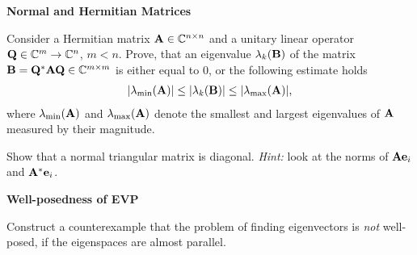 
\begin{Sheet}
  \label{sheet3}
  
  \textbf{Normal and Hermitian Matrices}
  
  \begin{Problem}
    Consider a Hermitian matrix $\mathbf A\in\mathbb C^{n\times n}$ and a unitary
    linear operator $\mathbf Q\in\mathbb C^m\to\mathbb C^n$, $m<n$. Prove, that an
    eigenvalue $\lambda_k(\mathbf B)$ of the matrix
    $\mathbf B=\mathbf Q^*\mathbf A\mathbf Q\in\mathbb C^{m\times m}$ is either equal to 0,
    or the following estimate holds
    \begin{gather*}
      \lvert\lambda_{\min}(\mathbf A)\rvert
      \leq \lvert\lambda_{k}(\mathbf B)\rvert
      \leq \lvert\lambda_{\max}(\mathbf A)\rvert,
    \end{gather*}
    where $\lambda_{\min}(\mathbf A)$ and $\lambda_{\max}(\mathbf A)$ denote
    the smallest and largest eigenvalues of $\mathbf A$ measured by their
    magnitude.
  \end{Problem}

  \begin{Problem}
  	Show that a normal triangular matrix is diagonal. \textit{Hint:}
  	look at the norms of $\mathbf A \mathbf e_i$ and $\mathbf A^*\mathbf e_i$.
  \end{Problem}

  \textbf{Well-posedness of EVP}

  \begin{Problem}
  	Construct a counterexample that the problem of finding
  	eigenvectors is \textit{not} well-posed, if the eigenspaces are
  	almost parallel.
  \end{Problem}


\end{Sheet}
